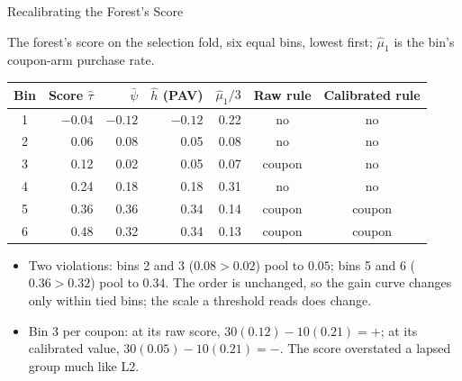 \documentclass[aspectratio=169, 11pt, handout]{beamer}
\newcommand{\hatt}{\hat{\tau}}
\begin{document}
\begin{frame}{Recalibrating the Forest's Score}

The forest's score on the selection fold, six equal bins, lowest first; $\hat\mu_1$ is the bin's coupon-arm purchase rate.

\begin{center}
\small
\begin{tabular}{crrrrcc}
\toprule
\textbf{Bin} & \textbf{Score $\hatt$} & $\bar\psi$ & $\hat h$ (\textbf{PAV}) & $\hat\mu_1/3$ & \textbf{Raw rule} & \textbf{Calibrated rule} \\
\midrule
1 & $-0.04$ & $-0.12$ & $-0.12$ & 0.22 & no & no \\
2 & 0.06 & 0.08 & 0.05 & 0.08 & no & no \\
3 & 0.12 & 0.02 & 0.05 & 0.07 & \textcolor{warnred}{coupon} & no \\
4 & 0.24 & 0.18 & 0.18 & 0.31 & no & no \\
5 & 0.36 & 0.36 & 0.34 & 0.14 & coupon & coupon \\
6 & 0.48 & 0.32 & 0.34 & 0.13 & coupon & coupon \\
\bottomrule
\end{tabular}
\end{center}

\small
\begin{itemize}
  \item Two violations: bins 2 and 3 ($0.08 > 0.02$) pool to $0.05$; bins 5 and 6 ($0.36 > 0.32$) pool to $0.34$. The order is unchanged, so the gain curve changes only within tied bins; the scale a threshold reads does change.
  \item Bin 3 per coupon: at its raw score, $30(0.12) - 10(0.21) = +$; at its calibrated value, $30(0.05) - 10(0.21) = -$. The score overstated a lapsed group much like L2.
\end{itemize}
\end{frame}
\end{document}
